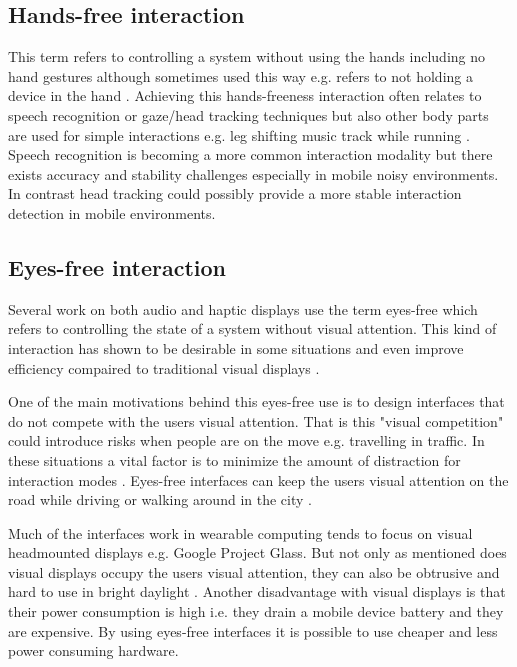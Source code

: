 \subsection{Hands-free interaction}
This term refers to controlling a system without using the hands including no hand gestures although sometimes used this way e.g. refers to not holding a device in the hand \cite{witt_designing_2006}. Achieving this hands-freeness interaction often relates to speech recognition or gaze/head tracking techniques but also other body parts are used for simple interactions e.g. leg shifting music track while running \cite{smus_running_2010}. Speech recognition is becoming a more common interaction modality but there exists accuracy and stability challenges especially in mobile noisy environments. In contrast head tracking could possibly provide a more stable interaction detection in mobile environments.

\subsection{Eyes-free interaction}
Several work on both audio \cite{kajastila_eyes-free_2013,bonner_no-look_2010,brewster_multimodaleyes-freeinteraction_2003,zhao_earpod:_2007,vazquez-alvarez_eyes-free_2011} and haptic \cite{pasquero_haptic_2011,pielot_tactile_2011} displays use the term eyes-free which refers to controlling the state of a system without visual attention. This kind of interaction has shown to be desirable in some situations \cite{oakley_designing_2007,yi_exploring_2012} and even improve efficiency compaired to traditional visual displays \cite{zhao_earpod:_2007}.

One of the main motivations behind this eyes-free use is to design interfaces that do not compete with the users visual attention. That is this "visual competition" could introduce risks when people are on the move e.g. travelling in traffic. In these situations a vital factor is to minimize the amount of distraction for interaction modes \cite{pascoe_using_2000}. Eyes-free interfaces can keep the users visual attention on the road while driving \cite{sodnik_user_2008} or walking around in the city \cite{vazquez-alvarez_eyes-free_2011}.

Much of the interfaces work in wearable computing tends to focus on visual headmounted displays \cite{barfield_fundamentals_2000} e.g. Google Project Glass. But not only as mentioned does visual displays occupy the users visual attention, they can also be obtrusive and hard to use in bright daylight \cite{geelhoed_safety_2000}. Another disadvantage with visual displays is that their power consumption is high i.e. they drain a mobile device battery and they are expensive. By using eyes-free interfaces it is possible to use cheaper and less power consuming hardware.


